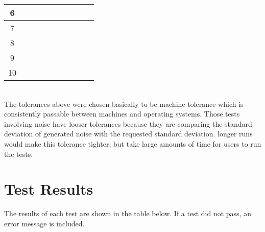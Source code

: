 \begin{table}[htbp]
\begin{tabular}{ c | c | c | c | c | c | c | c | c | c }
		6 & &&&&&&&&	   \\ \hline
		7    & &&&&&&&&	   \\ \hline
		8	& &&&&&&&&	   \\ \hline
		9	& &&&&&&&&	   \\ \hline
		10    & &&&&&&&&	   \\ \hline
		\hline
	\end{tabular}
\end{table}
%
\\The tolerances above were chosen basically to be machine tolerance which is consistently passable between machines and operating systems. Those tests involving noise have looser tolerances because they are comparing the standard deviation of generated noise with the requested standard deviation. longer runs would make this tolerance tighter, but take large amounts of time for users to run the tests.

\section{Test Results}
The results of each test are shown in the table below. If a test did not pass, an error message is included.

